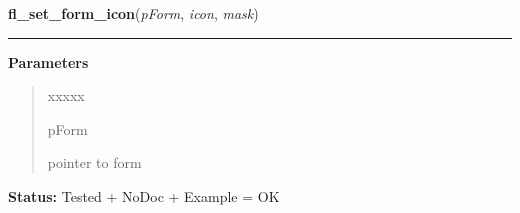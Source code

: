 \hspace{.8\funcindent}\begin{boxedminipage}{\funcwidth}

    \raggedright \textbf{fl\_set\_form\_icon}(\textit{pForm}, \textit{icon}, \textit{mask})

    \vspace{-1.5ex}

    \rule{\textwidth}{0.5\fboxrule}
\setlength{\parskip}{2ex}
\setlength{\parskip}{1ex}
      \textbf{Parameters}
      \vspace{-1ex}

      \begin{quote}
        \begin{Ventry}{xxxxx}

          \item[pForm]

          pointer to form

        \end{Ventry}

      \end{quote}

\textbf{Status:} Tested + NoDoc + Example = OK



    \end{boxedminipage}

    \label{xformslib:library:fl_get_decoration_sizes}

    \vspace{0.5ex}

